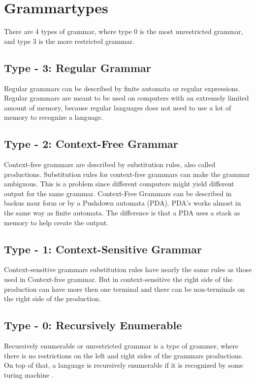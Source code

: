 \section{Grammartypes}
There are 4 types of grammar, where type 0 is the most unrestricted grammar, and type 3 is the more restricted grammar.

\subsection{Type - 3: Regular Grammar}
Regular grammars can be described by finite automata or regular expressions. Regular grammars are meant to be used on computers with an extremely limited amount of memory, because regular languages does not need to use a lot of memory to recognize a language.

\subsection{Type - 2: Context-Free Grammar}
Context-free grammars are described by substitution rules, also called productions. Substitution rules for context-free grammars can make the grammar ambiguous.
This is a problem since different computers might yield different output for the same grammar.
Context-Free Grammars can be described in backus naur form or by a Pushdown automata (PDA). PDA's works almost in the same way as finite automata. The difference is that a PDA uses a stack as memory to help create the output. 

\subsection{Type - 1: Context-Sensitive Grammar}
Context-sensitive grammars substitution rules have nearly the same rules as those used in Context-free grammar. But in context-sensitive the right side of the production can have more then one terminal and there can be non-terminals on the right side of the production.

\subsection{Type - 0: Recursively Enumerable}
Recursively enumerable or unrestricted grammar is a type of grammer, where there is no restrictions on the left and right sides of the grammars productions. On top of that, a language is recursively enumerable if it is recognized by some turing machine \citep{sipser}.  %

